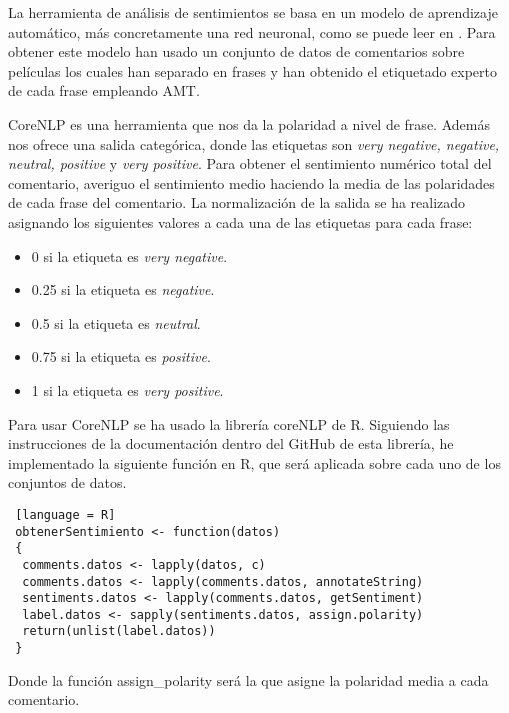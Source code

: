  La herramienta de análisis de sentimientos se basa en un modelo de aprendizaje automático, más concretamente una red neuronal, como se puede leer en \cite{corenlpfuncionamiento}. Para obtener este modelo han usado un conjunto de datos de comentarios sobre películas los cuales han separado en frases y han obtenido el etiquetado experto de cada frase empleando AMT.
 
 CoreNLP es una herramienta que nos da la polaridad a nivel de frase. Además nos ofrece una salida categórica, donde las etiquetas son \textit{very negative, negative, neutral, positive} y \textit{very positive}. Para obtener el sentimiento numérico total del comentario, averiguo el sentimiento medio haciendo la media de las polaridades de cada frase del comentario. La normalización de la salida se ha realizado asignando los siguientes valores a cada una de las etiquetas para cada frase:
 \begin{itemize}
 	\item 0 si la etiqueta es \textit{very negative}.
 	\item 0.25 si la etiqueta es \textit{negative}.
 	\item 0.5 si la etiqueta es \textit{neutral}.
 	\item 0.75 si la etiqueta es \textit{positive}.
 	\item 1 si la etiqueta es \textit{very positive}.
 \end{itemize}

Para usar CoreNLP se ha usado la librería coreNLP de R. Siguiendo las instrucciones de la documentación dentro del GitHub \cite{corenlpgithub} de esta librería, he implementado la siguiente función en R, que será aplicada sobre cada uno de los conjuntos de datos.

\begin{lstlisting} [language = R]
 obtenerSentimiento <- function(datos)
 {
  comments.datos <- lapply(datos, c)
  comments.datos <- lapply(comments.datos, annotateString)
  sentiments.datos <- lapply(comments.datos, getSentiment)
  label.datos <- sapply(sentiments.datos, assign.polarity)
  return(unlist(label.datos))
 }
\end{lstlisting}

Donde la función assign\_polarity será la que asigne la polaridad media a cada comentario.


